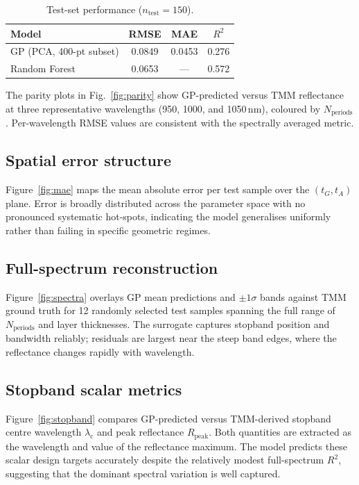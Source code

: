 \documentclass[9pt,twocolumn]{optica-article}
\begin{document}
\begin{table}[h]
\centering
\caption{Test-set performance ($n_\mathrm{test}=150$).}
\label{tab:metrics}
\begin{tabular}{lccc}
\toprule
Model & RMSE & MAE & $R^2$ \\
\midrule
GP (PCA, 400-pt subset) & 0.0849 & 0.0453 & 0.276 \\
Random Forest           & 0.0653 & ---    & 0.572 \\
\bottomrule
\end{tabular}
\end{table}

The parity plots in Fig.~\ref{fig:parity} show GP-predicted versus TMM reflectance
at three representative wavelengths (950, 1000, and 1050\,nm), coloured by
$N_\mathrm{periods}$.
Per-wavelength RMSE values are consistent with the spectrally averaged metric.

\subsection{Spatial error structure}

Figure~\ref{fig:mae} maps the mean absolute error per test sample over the
$(t_G, t_A)$ plane.
Error is broadly distributed across the parameter space with no pronounced
systematic hot-spots, indicating the model generalises uniformly rather than
failing in specific geometric regimes.

\subsection{Full-spectrum reconstruction}

Figure~\ref{fig:spectra} overlays GP mean predictions and $\pm1\sigma$ bands against
TMM ground truth for 12 randomly selected test samples spanning the full range of
$N_\mathrm{periods}$ and layer thicknesses.
The surrogate captures stopband position and bandwidth reliably; residuals are largest
near the steep band edges, where the reflectance changes rapidly with wavelength.

\subsection{Stopband scalar metrics}

Figure~\ref{fig:stopband} compares GP-predicted versus TMM-derived stopband centre
wavelength $\lambda_\mathrm{c}$ and peak reflectance $R_\mathrm{peak}$.
Both quantities are extracted as the wavelength and value of the reflectance maximum.
The model predicts these scalar design targets accurately despite the relatively
modest full-spectrum $R^2$, suggesting that the dominant spectral variation is well
captured.
\end{document}
